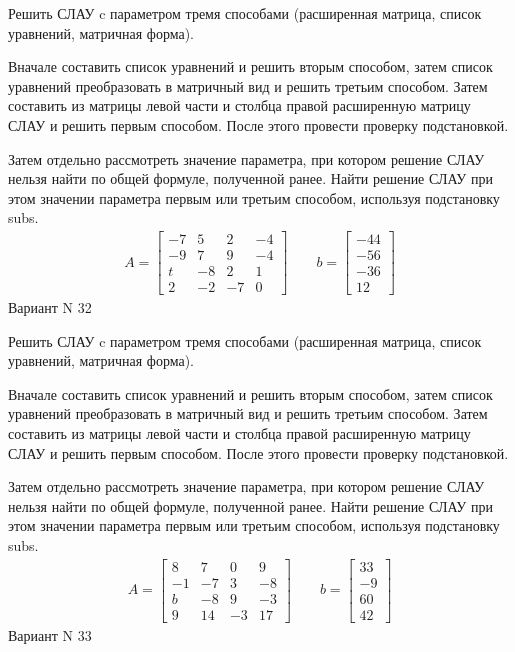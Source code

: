 \documentclass[11pt]{report}
\begin{document}
Решить СЛАУ c параметром тремя способами (расширенная матрица, список уравнений, матричная форма).

Вначале составить список уравнений и решить вторым способом,
затем список уравнений преобразовать в матричный вид и решить третьим способом.
Затем составить из матрицы левой части и столбца правой расширенную матрицу СЛАУ и решить первым способом.
После этого провести проверку подстановкой.

Затем отдельно рассмотреть значение параметра, при котором решение СЛАУ нельзя найти по общей формуле,
полученной ранее.
Найти решение СЛАУ при этом значении параметра первым или третьим способом, используя подстановку subs.
\begin{align*}
    A = \left[\begin{matrix}-7 & 5 & 2 & -4\\-9 & 7 & 9 & -4\\t & -8 & 2 & 1\\2 & -2 & -7 & 0\end{matrix}\right]
\qquad b = \left[\begin{matrix}-44\\-56\\-36\\12\end{matrix}\right]
\end{align*}
\newpage
Вариант N 32


Решить СЛАУ c параметром тремя способами (расширенная матрица, список уравнений, матричная форма).

Вначале составить список уравнений и решить вторым способом,
затем список уравнений преобразовать в матричный вид и решить третьим способом.
Затем составить из матрицы левой части и столбца правой расширенную матрицу СЛАУ и решить первым способом.
После этого провести проверку подстановкой.

Затем отдельно рассмотреть значение параметра, при котором решение СЛАУ нельзя найти по общей формуле,
полученной ранее.
Найти решение СЛАУ при этом значении параметра первым или третьим способом, используя подстановку subs.
\begin{align*}
    A = \left[\begin{matrix}8 & 7 & 0 & 9\\-1 & -7 & 3 & -8\\b & -8 & 9 & -3\\9 & 14 & -3 & 17\end{matrix}\right]
\qquad b = \left[\begin{matrix}33\\-9\\60\\42\end{matrix}\right]
\end{align*}
\newpage
Вариант N 33
\end{document}

